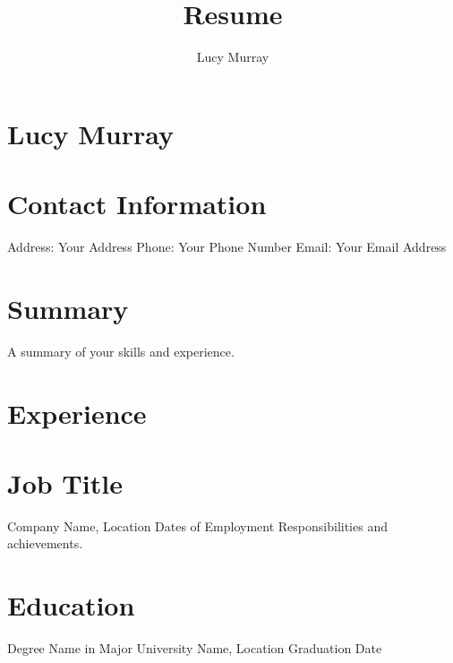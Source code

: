 \documentclass{article}%
\title{Resume}%
\author{Lucy Murray}%
\date{}%
\begin{document}
%
\normalsize%
\section{Lucy Murray}%
\label{sec:LucyMurray}%

%
\section{Contact Information}%
\label{sec:ContactInformation}%

%
Address: Your Address\newline%
%
Phone: Your Phone Number\newline%
%
Email: Your Email Address\newline%
%
\section{Summary}%
\label{sec:Summary}%

%
A summary of your skills and experience.%
\section{Experience}%
\label{sec:Experience}%

%
\section{Job Title}%
\label{sec:JobTitle}%
Company Name, Location\newline%
%
Dates of Employment\newline%
%
Responsibilities and achievements.\newline%

%
\section{Education}%
\label{sec:Education}%

%
Degree Name in Major\newline%
%
University Name, Location\newline%
%
Graduation Date\newline%
%
\end{document}
